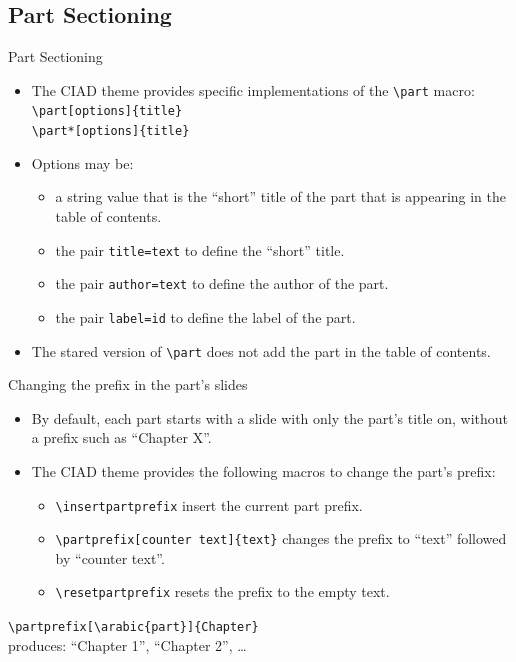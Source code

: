 \documentclass[english,sectioncirclenumberstyle]{ciadbeamer}
\begin{document}
\subsection{Part Sectioning}

\begin{frame}{Part Sectioning}
	\begin{itemize}
	\item The CIAD theme provides specific implementations of the \texttt{{\textbackslash}part} macro: \\
		\texttt{{\textbackslash}part[options]\{title\}} \\
		\texttt{{\textbackslash}part*[options]\{title\}}
	\vfill
	\item Options may be: \begin{itemize}
		\item a string value that is the ``short'' title of the part that is appearing in the table of contents.
		\item the pair \texttt{title=text} to define the ``short'' title.
		\item the pair \texttt{author=text} to define the author of the part.
		\item the pair \texttt{label=id} to define the label of the part.
		\end{itemize}
	\vfill
	\item The stared version of \texttt{{\textbackslash}part} does not add the part in the table of contents.
	\end{itemize}
\end{frame}

\begin{frame}{{Changing the prefix} in the part's slides}
	\begin{itemize}
	\item By default, each part starts with a slide with only the part's title on, without a prefix such as ``Chapter X''.
	\vfill
	\item The CIAD theme provides the following macros to change the part's prefix:
		\begin{itemize}
		\item \texttt{{\textbackslash}insertpartprefix} insert the current part prefix.
		\item \texttt{{\textbackslash}partprefix[counter text]\{text\}} changes the prefix to ``text'' followed by ``counter text''.
		\item \texttt{{\textbackslash}resetpartprefix} resets the prefix to the empty text.
		\end{itemize}
	\end{itemize}
	\vfill
	\begin{example}
		\texttt{{\textbackslash}partprefix[{\textbackslash}arabic\{part\}]\{Chapter\}} \\
		produces: ``Chapter 1'', ``Chapter 2'', \dots
	\end{example}
\end{frame}
\end{document}
